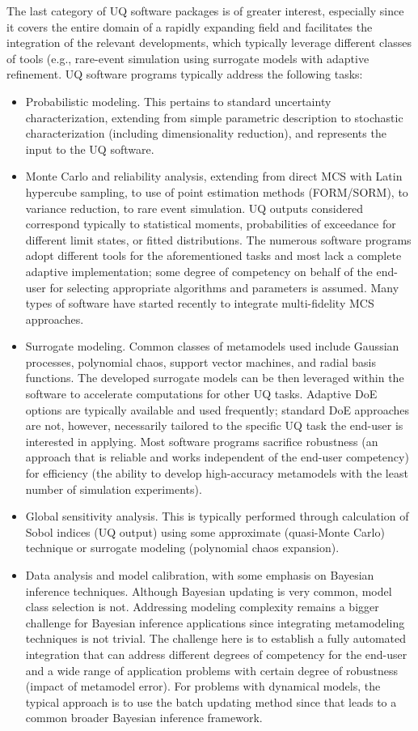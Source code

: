 The last category of UQ software packages is of greater interest, especially since it covers the entire domain of a rapidly expanding field and facilitates the integration of the relevant developments, which typically leverage different classes of tools (e.g., rare-event simulation using surrogate models with adaptive refinement. UQ software programs typically address the following tasks:

\begin{itemize}
    \item Probabilistic modeling. This pertains to standard uncertainty characterization, extending from simple parametric description to stochastic characterization (including dimensionality reduction), and represents the input to the UQ software. 
    \item Monte Carlo and reliability analysis, extending from direct MCS with Latin hypercube sampling, to use of point estimation methods (FORM/SORM), to variance reduction, to rare event simulation. UQ outputs considered correspond typically to statistical moments, probabilities of exceedance for different limit states, or fitted distributions. The numerous software programs adopt different tools for the aforementioned tasks and most lack a complete adaptive implementation; some degree of competency on behalf of the end-user for selecting appropriate algorithms and parameters is assumed. Many types of software have started recently to integrate multi-fidelity MCS approaches.
    \item Surrogate modeling. Common classes of metamodels used include Gaussian processes, polynomial chaos, support vector machines, and radial basis functions. The developed surrogate models can be then leveraged within the software to accelerate computations for other UQ tasks. Adaptive DoE options are typically available and used frequently; standard DoE approaches are not, however, necessarily tailored to the specific UQ task the end-user is interested in applying. Most software programs sacrifice robustness (an approach that is reliable and works independent of the end-user competency) for efficiency (the ability to develop high-accuracy metamodels with the least number of simulation experiments).
    \item Global sensitivity analysis. This is typically performed through calculation of Sobol indices (UQ output) using some approximate (quasi-Monte Carlo) technique or surrogate modeling (polynomial chaos expansion). 
    \item Data analysis and model calibration, with some emphasis on Bayesian inference techniques. Although Bayesian updating is very common, model class selection is not. Addressing modeling complexity remains a bigger challenge for Bayesian inference applications since integrating metamodeling techniques is not trivial. The challenge here is to establish a fully automated integration that can address different degrees of competency for the end-user and a wide range of application problems with certain degree of robustness (impact of metamodel error). For problems with dynamical models, the typical approach is to use the batch updating method since that leads to a common broader Bayesian inference framework. 

\end{itemize}

